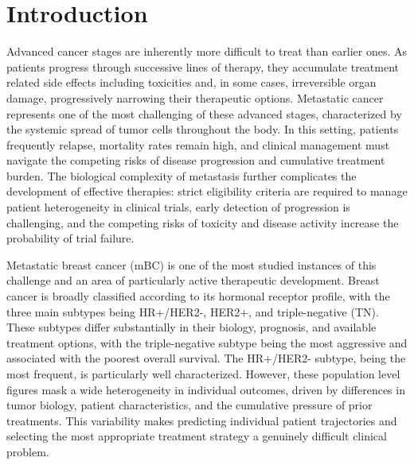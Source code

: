 \documentclass[a4paper,10pt]{article}
\title{}
\date{}
\author{}
\begin{document}
\maketitle
\section{Introduction}

Advanced cancer stages are inherently more difficult to treat than earlier ones. As patients progress through successive lines of therapy, they accumulate treatment related side effects including toxicities and, in some cases, irreversible organ damage, progressively narrowing their therapeutic options. Metastatic cancer represents one of the most challenging of these advanced stages, characterized by the systemic spread of tumor cells throughout the body. In this setting, patients frequently relapse, mortality rates remain high, and clinical management must navigate the competing risks of disease progression and cumulative treatment burden. The biological complexity of metastasis further complicates the development of effective therapies: strict eligibility criteria are required to manage patient heterogeneity in clinical trials, early detection of progression is challenging, and the competing risks of toxicity and disease activity increase the probability of trial failure.

Metastatic breast cancer (mBC) is one of the most studied instances of this challenge and an area of particularly active therapeutic development. Breast cancer is broadly classified according to its hormonal receptor profile, with the three main subtypes being HR+/HER2-, HER2+, and triple-negative (TN). These subtypes differ substantially in their biology, prognosis, and available treatment options, with the triple-negative subtype being the most aggressive and associated with the poorest overall survival. The HR+/HER2- subtype, being the most frequent, is particularly well characterized. However, these population level figures mask a wide heterogeneity in individual outcomes, driven by differences in tumor biology, patient characteristics, and the cumulative pressure of prior treatments. This variability makes predicting individual patient trajectories and selecting the most appropriate treatment strategy a genuinely difficult clinical problem.
\end{document}
